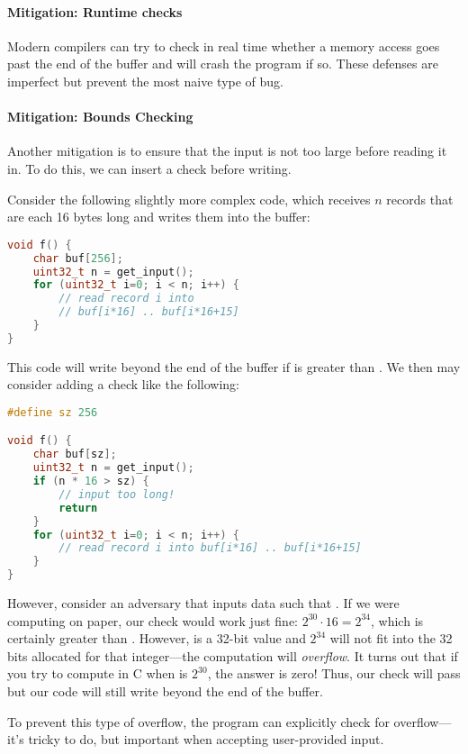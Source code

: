 \paragraph{Mitigation: Runtime checks}
Modern compilers can try to check in real time whether a memory access goes
past the end of the buffer and will crash the program if so. 
These defenses are imperfect but prevent the most naive type of bug.

\paragraph{Mitigation: Bounds Checking}
Another mitigation is to ensure that the input is not too large before reading it in.
To do this, we can insert a check before writing. 

Consider the following slightly more complex code, which receives $n$ records that are each 16 bytes long and writes them into the buffer:

\begin{lstlisting}[language=c]
void f() {
	char buf[256];
	uint32_t n = get_input();
	for (uint32_t i=0; i < n; i++) {
		// read record i into 
		// buf[i*16] .. buf[i*16+15]
	}
}
\end{lstlisting}

This code will write beyond the end of the buffer if  is greater than . We then may consider adding a check like the following:
\begin{lstlisting}[language=c]
#define sz 256

void f() {
	char buf[sz];
	uint32_t n = get_input();
	if (n * 16 > sz) {
		// input too long!
		return
	}
	for (uint32_t i=0; i < n; i++) {
		// read record i into buf[i*16] .. buf[i*16+15]
	}
}
\end{lstlisting}

However, consider an adversary that inputs data such that . If we
were computing on paper, our check would work just fine: $2^{30} \cdot 16 = 2^{34}$,
which is certainly greater than . However,  is a 32-bit value
and $2^{34}$ will not fit into the 32 bits allocated for that integer---the computation
will \emph{overflow}.
It turns out that if you try to compute
 in C when  is $2^{30}$, the answer is zero! Thus, our check
will pass but our code will still write beyond the end of the buffer. 

To prevent this type of overflow, the program can explicitly check
for overflow---it's tricky to do, but important when accepting user-provided input.


